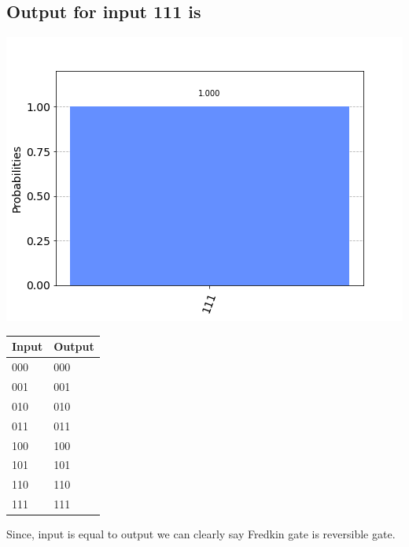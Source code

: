 \documentclass[a4paper]{article}
\begin{document}
\begin{answer}[Question 1 a]
        \subsection*{Output for input 111 is}
        \includegraphics[scale = 0.5]{1a111-out.png}\\
        \begin{center}
            \begin{tabular}{ | m{3cm}| m{3cm} | } 
                \hline
                Input	&	Output \\
                \hline
                000 & 000\\
                001 & 001\\
                010 & 010\\
                011 & 011\\
                100 & 100\\
                101 & 101\\
                110 & 110\\
                111 & 111\\
                \hline
            \end{tabular}
        \end{center}
        Since, input is equal to output we can clearly say Fredkin gate is reversible gate. 
    \end{answer}
\end{document}
